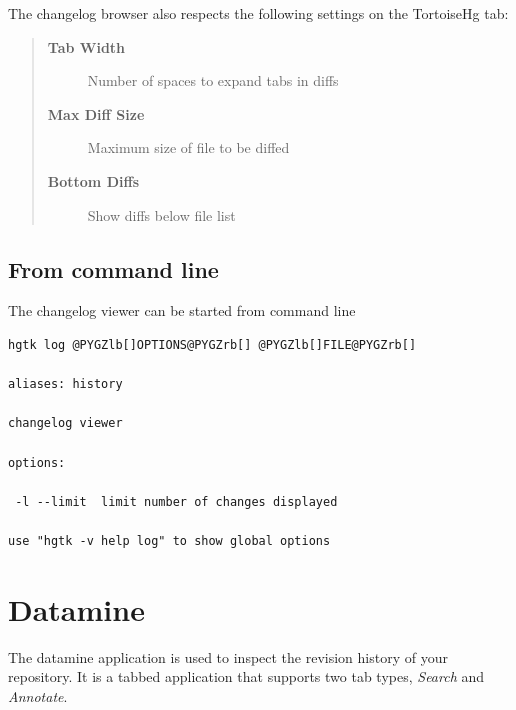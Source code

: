 \documentclass[letterpaper,10pt,english]{manual}
\begin{document}
The changelog browser also respects the following settings on the
TortoiseHg tab:
\begin{quote}
\begin{description}
\item[\textbf{Tab Width}]
Number of spaces to expand tabs in diffs

\item[\textbf{Max Diff Size}]
Maximum size of file to be diffed

\item[\textbf{Bottom Diffs}]
Show diffs below file list

\end{description}
\end{quote}


\subsection{From command line}

The changelog viewer can be started from command line

\begin{Verbatim}[commandchars=@\[\]]
hgtk log @PYGZlb[]OPTIONS@PYGZrb[] @PYGZlb[]FILE@PYGZrb[]

aliases: history

changelog viewer

options:

 -l --limit  limit number of changes displayed

use "hgtk -v help log" to show global options
\end{Verbatim}

\resetcurrentobjects
\hypertarget{--doc-datamine}{}

\section{Datamine}
\hypertarget{module-datamine.dialog}{}
The datamine application is used to inspect the revision history of your
repository.  It is a tabbed application that supports two tab types,
\emph{Search} and \emph{Annotate}.
\end{document}
